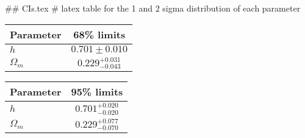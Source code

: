 ## CIs.tex
# latex table for the 1 and 2 sigma distribution of each parameter

\begin{tabular} { l  c}
 Parameter &  68\% limits\\
\hline
{\boldmath$h              $} & $0.701\pm 0.010            $\\
{\boldmath$\Omega_m       $} & $0.229^{+0.031}_{-0.043}   $\\
\hline
\end{tabular}

\begin{tabular} { l  c}
 Parameter &  95\% limits\\
\hline
{\boldmath$h              $} & $0.701^{+0.020}_{-0.020}   $\\
{\boldmath$\Omega_m       $} & $0.229^{+0.077}_{-0.070}   $\\
\hline
\end{tabular}
